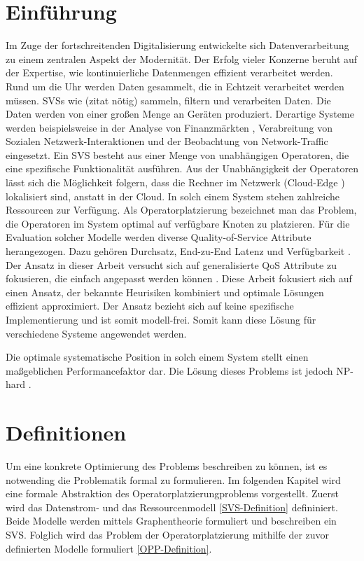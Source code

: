 \documentclass{article}
\begin{document}
\section{Einführung}
Im Zuge der fortschreitenden Digitalisierung entwickelte sich Datenverarbeitung zu einem zentralen Aspekt der Modernität.
Der Erfolg vieler Konzerne beruht auf der Expertise, wie kontinuierliche Datenmengen effizient verarbeitet werden.
Rund um die Uhr werden Daten gesammelt, die in Echtzeit verarbeitet werden müssen. 
SVSs wie (zitat nötig) sammeln, filtern und verarbeiten Daten. Die Daten werden von einer großen Menge an 
Geräten produziert. Derartige Systeme werden beispielsweise in der Analyse von Finanzmärkten \cite{k5}, 
Verabreitung von Sozialen Netzwerk-Interaktionen und der Beobachtung von Network-Traffic \cite{k5} 
eingesetzt. Ein SVS besteht aus einer Menge von unabhängigen Operatoren, die eine spezifische
Funktionalität ausführen. Aus der Unabhängigkeit der Operatoren lässt sich die Möglichkeit folgern, 
dass die Rechner im Netzwerk (Cloud-Edge \cite{k6}) lokalisiert sind, anstatt in der Cloud.
In solch einem System stehen zahlreiche Ressourcen zur Verfügung. 
Als Operatorplatzierung bezeichnet man das Problem, 
die Operatoren im System optimal auf verfügbare Knoten zu platzieren.
Für die Evaluation solcher Modelle werden diverse Quality-of-Service Attribute herangezogen. 
Dazu gehören Durchsatz, End-zu-End Latenz und Verfügbarkeit \cite{efficient-operator-placement} \cite{cardellini-optimal_operatorplc}.  Der Ansatz in dieser Arbeit versucht sich auf generalisierte QoS Attribute 
zu fokusieren, die einfach angepasst werden können \cite{efficient-operator-placement}.
Diese Arbeit fokusiert sich auf einen Ansatz, der bekannte Heurisiken kombiniert und optimale Lösungen effizient approximiert. Der Ansatz bezieht sich auf keine spezifische
Implementierung und ist somit modell-frei. Somit kann diese Lösung für verschiedene Systeme angewendet werden.

Die optimale systematische Position in solch einem System stellt einen maßgeblichen Performancefaktor dar. Die Lösung dieses Problems ist jedoch NP-hard \cite{cardellini-optimal_operatorplc}.

\section{Definitionen}
Um eine konkrete Optimierung des Problems beschreiben zu können, ist es notwending die Problematik formal zu formulieren. 
Im folgenden Kapitel %
wird eine formale Abstraktion des Operatorplatzierungproblems vorgestellt. Zuerst wird das Datenstrom- 
und das Ressourcenmodell \ref{SVS-Definition} defininiert. Beide Modelle werden mittels Graphentheorie formuliert und beschreiben 
ein SVS. 
Folglich wird das Problem der Operatorplatzierung mithilfe der zuvor definierten Modelle formuliert \ref{OPP-Definition}. 
\end{document}
